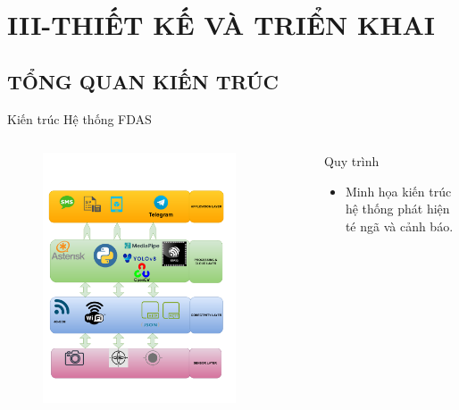 \section{III-THIẾT KẾ VÀ TRIỂN KHAI}
\subsection{TỔNG QUAN KIẾN TRÚC}

\begin{frame}[fragile]{Kiến trúc Hệ thống FDAS}
    \begin{columns}[t]
        \begin{column}{0.5\textwidth}
            \begin{figure}
                \centering
                \includegraphics[width=0.85\textwidth,height=0.8\textheight,keepaspectratio]{images/system_architecture_diagram.pdf}
            \end{figure}
        \end{column}
        \begin{column}{0.5\textwidth}
            \begin{block}{Quy trình}
                \begin{itemize}
                    \item Minh họa kiến trúc hệ thống phát hiện té ngã và cảnh báo.

\end{itemize}
\end{block}
\end{column}
\end{columns}
\end{frame}
